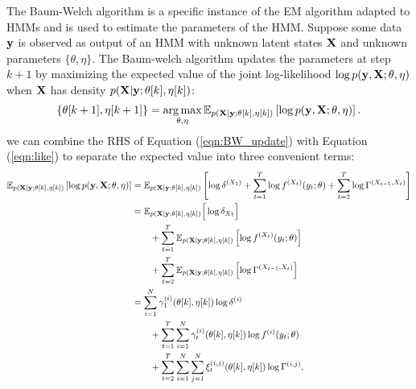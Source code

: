 The Baum-Welch algorithm is a specific instance of the EM algorithm adapted to HMMs and is used to estimate the parameters of the HMM. Suppose some data $\mathbf{y}$ is observed as output of an HMM with unknown latent states $\mathbf{X}$ and unknown parameters $\{\theta,\eta\}$. The Baum-welch algorithm updates the parameters at step $k+1$ by maximizing the expected value of the joint log-likelihood $\log p(\mathbf{y},\mathbf{X}; \theta,\eta)$ when $\mathbf{X}$ has density $p(\mathbf{X} | \mathbf{y};\theta[k],\eta[k])$:
%
\begin{equation}
    \left\{\theta[k+1],\eta[k+1]\right\} = \operatorname*{arg\,max}_{\theta,\eta} \mathbb{E}_{p(\mathbf{X} | \mathbf{y};\theta[k],\eta[k])} \left[\log p(\mathbf{y},\mathbf{X};\theta,\eta)\right].
    \label{eqn:BW_update}
\end{equation}
%
we can combine the RHS of Equation (\ref{eqn:BW_update}) with Equation (\ref{eqn:like}) to separate the expected value into three convenient terms:
\begin{align*}
    \mathbb{E}_{p(\mathbf{X} \mid \mathbf{y};\theta[k],\eta[k])}\left[\log p(\mathbf{y},\mathbf{X};\theta,\eta) \right] &= \mathbb{E}_{p(\mathbf{X} \mid \mathbf{y};\theta[k],\eta[k])} \left[\log \delta^{(X_1)} + \sum_{t=1}^T \log f^{(X_t)}(y_t;\theta) + \sum_{t=2}^{T} \log \Gamma^{(X_{t-1},X_{t})} \right] \\
    &= \mathbb{E}_{p(\mathbf{X} \mid \mathbf{y};\theta[k],\eta[k])} \Big[\log \delta_{X_1}\Big] \\ & \qquad + \sum_{t = 1}^T \mathbb{E}_{p(\mathbf{X} \mid \mathbf{y};\theta[k],\eta[k])} \left[ \log f^{(X_t)}(y_t;\theta)\right] \\ & \qquad + \sum_{t=2}^{T} \mathbb{E}_{p(\mathbf{X} \mid \mathbf{y};\theta[k],\eta[k])} \left[ \log \Gamma^{(X_{t-1},X_{t})} \right] \\
    &= \sum_{i=1}^N \gamma^{(i)}_1(\theta[k],\eta[k]) \log \delta^{(i)} \\ & \qquad + \sum_{t = 1}^T \sum_{i=1}^N \gamma^{(i)}_t(\theta[k],\eta[k]) \log f^{(i)}(y_t;\theta) \\
    & \qquad + \sum_{t=2}^{T} \sum_{i=1}^N \sum_{j=1}^N \xi_t^{(i,j)}(\theta[k],\eta[k]) \log \Gamma^{(i,j)}.
\end{align*}

